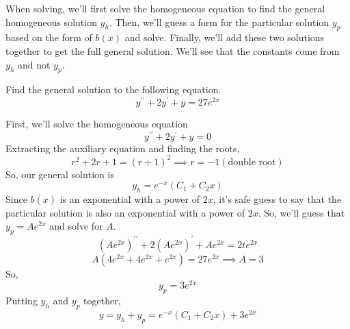 \noindent
When solving, we'll first solve the homogeneous equation to find the general homogeneous solution $y_h$. Then, we'll guess a form for the particular solution $y_p$ based on the form of $b(x)$ and solve. Finally, we'll add these two solutions together to get the full general solution. We'll see that the constants come from $y_h$ and not $y_p$.

\begin{example}
	Find the general solution to the following equation.
	\begin{equation*}
		y^{\prime\prime} + 2y^\prime + y = 27e^{2x}
	\end{equation*}
\end{example}
\noindent
First, we'll solve the homogeneous equation
\begin{equation*}
	y^{\prime\prime} + 2y^\prime + y = 0
\end{equation*}
Extracting the auxiliary equation and finding the roots,
\begin{equation*}
	r^2 + 2r + 1 = \left(r+1\right)^2 \implies r = -1 \left(\text{double root}\right)
\end{equation*}
So, our general solution is
\begin{equation*}
	y_h = e^{-x}\left(C_1 + C_2x\right)
\end{equation*}
Since $b(x)$ is an exponential with a power of $2x$, it's safe guess to say that the particular solution is also an exponential with a power of $2x$. So, we'll guess that $y_p = Ae^{2x}$ and solve for $A$.
\begin{equation*}
	\left(Ae^{2x}\right)^{\prime\prime} + 2\left(Ae^{2x}\right)^\prime + Ae^{2x} = 2te^{2x}
\end{equation*}
\begin{equation*}
	A\left(4e^{2x} + 4e^{2x} + e^{2x}\right) = 27e^{2x} \implies A = 3
\end{equation*}
So,
\begin{equation*}
	y_p = 3e^{2x}
\end{equation*}
Putting $y_h$ and $y_p$ together,
\begin{equation*}
	y = y_h + y_p = e^{-x}\left(C_1 + C_2x\right) + 3e^{2x}
\end{equation*}


